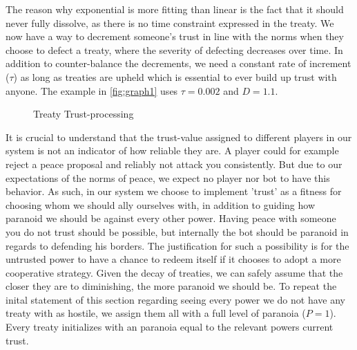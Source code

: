 \documentclass[a4paper]{article} %
\begin{document}
The reason why exponential is more fitting than linear is the fact that it should never fully dissolve, as there is no time constraint expressed in the treaty. We now have a way to decrement someone's trust in line with the norms when they choose to defect a treaty, where the severity of defecting decreases over time. In addition to counter-balance the decrements, we need a constant rate of increment ($\tau$) as long as treaties are upheld which is essential to ever build up trust with anyone. The example in \autoref{fig:graph1} uses $\tau = 0.002$ and $D = 1.1$.

\begin{figure}[H]
\centering
{}
\caption{Treaty Trust-processing}
\label{fig:graph1}
\end{figure}

It is crucial to understand that the trust-value assigned to different players in our system is not an indicator of how reliable they are. A player could for example reject a peace proposal and reliably not attack you consistently. But due to our expectations of the norms of peace, we expect no player nor bot to have this behavior. As such, in our system we choose to implement 'trust' as a fitness for choosing whom we should ally ourselves with, in addition to guiding how paranoid we should be against every other power. Having peace with someone you do not trust should be possible, but internally the bot should be paranoid in regards to defending his borders. The justification for such a possibility is for the untrusted power to have a chance to redeem itself if it chooses to adopt a more cooperative strategy. Given the decay of treaties, we can safely assume that the closer they are to diminishing, the more paranoid we should be. To repeat the inital statement of this section regarding seeing every power we do not have any treaty with as hostile, we assign them all with a full level of paranoia ($P = 1$). Every treaty initializes with an paranoia equal to the relevant powers current trust. 
\end{document}
